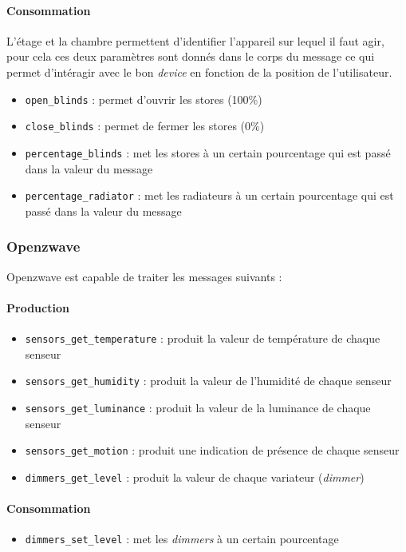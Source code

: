 \paragraph{Consommation}
L'étage et la chambre permettent d'identifier l'appareil sur lequel il faut agir, pour cela ces deux paramètres sont donnés dans le corps du message ce qui permet d'intéragir avec le bon \textit{device} en fonction de la position de l'utilisateur.
\begin{itemize}
    \item \texttt{open_blinds} : permet d'ouvrir les stores (100\%)
    \item \texttt{close_blinds} : permet de fermer les stores (0\%)
    \item \texttt{percentage_blinds} : met les stores à un certain pourcentage qui est passé dans la valeur du message
    \item \texttt{percentage_radiator} : met les radiateurs à un certain pourcentage qui est passé dans la valeur du message
\end{itemize}

\subsubsection{Openzwave}
Openzwave est capable de traiter les messages suivants : 
\paragraph{Production}
\begin{itemize}
    \item \texttt{sensors_get_temperature} : produit la valeur de température de chaque senseur
    \item \texttt{sensors_get_humidity} : produit la valeur de l'humidité de chaque senseur
    \item \texttt{sensors_get_luminance} : produit la valeur de la luminance de chaque senseur
    \item \texttt{sensors_get_motion} : produit une indication de présence de chaque senseur
    \item \texttt{dimmers_get_level} : produit la valeur de chaque variateur (\textit{dimmer})
\end{itemize}

\paragraph{Consommation}
\begin{itemize}
    \item \texttt{dimmers_set_level} : met les \textit{dimmers} à un certain pourcentage
\end{itemize}

